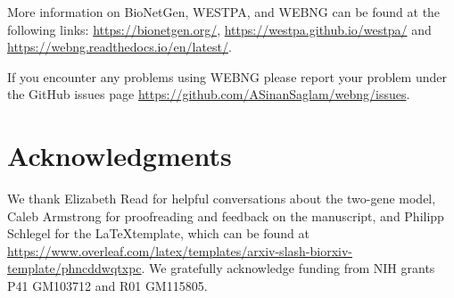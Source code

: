\documentclass[10pt,letterpaper]{article}
\begin{document}
More information on BioNetGen, WESTPA, and WEBNG can be found at the following links: \url{https://bionetgen.org/}, \url{https://westpa.github.io/westpa/}
and \url{https://webng.readthedocs.io/en/latest/}.

If you encounter any problems using WEBNG please report your problem under the GitHub issues page \url{https://github.com/ASinanSaglam/webng/issues}.

\section*{Acknowledgments}
We thank Elizabeth Read for helpful conversations about the two-gene model, Caleb Armstrong for proofreading and feedback on the manuscript, and Philipp Schlegel for the \LaTeX template, which can be found at \url{https://www.overleaf.com/latex/templates/arxiv-slash-biorxiv-template/phncddwqtxpc}.
We gratefully acknowledge funding from NIH grants P41 GM103712 and R01 GM115805.

\nolinenumbers




\end{document}

